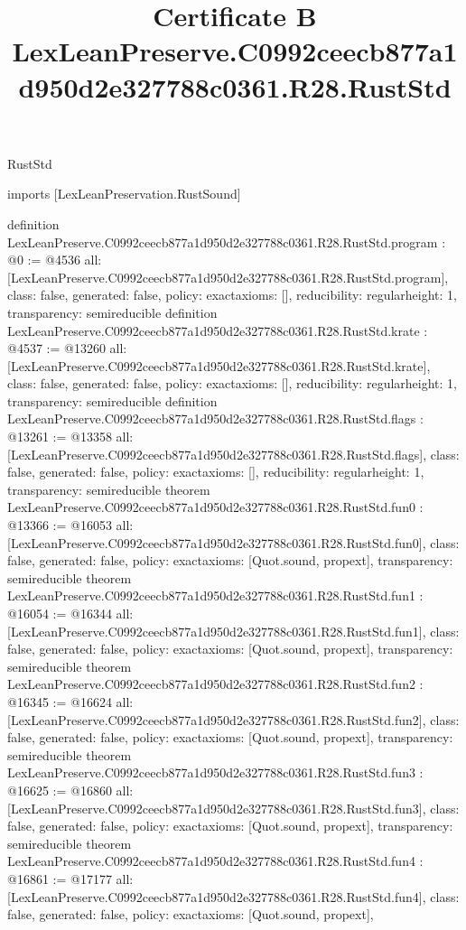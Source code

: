 \begin{lexlean}{RustStd}
\title{Certificate B LexLeanPreserve.C0992ceecb877a1d950d2e327788c0361.R28.RustStd}
\begin{coremodule}
imports [LexLeanPreservation.RustSound]

definition LexLeanPreserve.C0992ceecb877a1d950d2e327788c0361.R28.RustStd.program : @0 := @4536 {
  all: [LexLeanPreserve.C0992ceecb877a1d950d2e327788c0361.R28.RustStd.program],
  class: false,
  generated: false,
  policy: exact{axioms: []},
  reducibility: regular{height: 1},
  transparency: semireducible
}
definition LexLeanPreserve.C0992ceecb877a1d950d2e327788c0361.R28.RustStd.krate : @4537 := @13260 {
  all: [LexLeanPreserve.C0992ceecb877a1d950d2e327788c0361.R28.RustStd.krate],
  class: false,
  generated: false,
  policy: exact{axioms: []},
  reducibility: regular{height: 1},
  transparency: semireducible
}
definition LexLeanPreserve.C0992ceecb877a1d950d2e327788c0361.R28.RustStd.flags : @13261 := @13358 {
  all: [LexLeanPreserve.C0992ceecb877a1d950d2e327788c0361.R28.RustStd.flags],
  class: false,
  generated: false,
  policy: exact{axioms: []},
  reducibility: regular{height: 1},
  transparency: semireducible
}
theorem LexLeanPreserve.C0992ceecb877a1d950d2e327788c0361.R28.RustStd.fun0 : @13366 := @16053 {
  all: [LexLeanPreserve.C0992ceecb877a1d950d2e327788c0361.R28.RustStd.fun0],
  class: false,
  generated: false,
  policy: exact{axioms: [Quot.sound, propext]},
  transparency: semireducible
}
theorem LexLeanPreserve.C0992ceecb877a1d950d2e327788c0361.R28.RustStd.fun1 : @16054 := @16344 {
  all: [LexLeanPreserve.C0992ceecb877a1d950d2e327788c0361.R28.RustStd.fun1],
  class: false,
  generated: false,
  policy: exact{axioms: [Quot.sound, propext]},
  transparency: semireducible
}
theorem LexLeanPreserve.C0992ceecb877a1d950d2e327788c0361.R28.RustStd.fun2 : @16345 := @16624 {
  all: [LexLeanPreserve.C0992ceecb877a1d950d2e327788c0361.R28.RustStd.fun2],
  class: false,
  generated: false,
  policy: exact{axioms: [Quot.sound, propext]},
  transparency: semireducible
}
theorem LexLeanPreserve.C0992ceecb877a1d950d2e327788c0361.R28.RustStd.fun3 : @16625 := @16860 {
  all: [LexLeanPreserve.C0992ceecb877a1d950d2e327788c0361.R28.RustStd.fun3],
  class: false,
  generated: false,
  policy: exact{axioms: [Quot.sound, propext]},
  transparency: semireducible
}
theorem LexLeanPreserve.C0992ceecb877a1d950d2e327788c0361.R28.RustStd.fun4 : @16861 := @17177 {
  all: [LexLeanPreserve.C0992ceecb877a1d950d2e327788c0361.R28.RustStd.fun4],
  class: false,
  generated: false,
  policy: exact{axioms: [Quot.sound, propext]},
}
\end{coremodule}
\end{lexlean}
